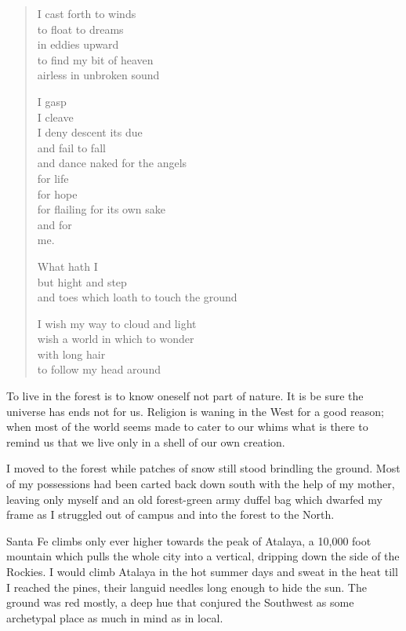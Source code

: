 \documentclass[ebook, 10pt, openright, onecolumn]{memoir}
\newenvironment{poetry}
{
  \begin{quote}
    \begin{itshape}
      \small
    }
    {
    \end{itshape}
  \end{quote}
}
\begin{document}
\begin{poetry}
  I cast forth to winds\\
  to float to dreams\\
  in eddies upward\\
  to find my bit of heaven\\
  airless in unbroken sound

  I gasp\\
  I cleave\\
  I deny descent its due\\
  and fail to fall\\
  and dance naked for the angels\\
  for life\\
  for hope\\
  for flailing for its own sake\\
  and for\\
  me.
  
  What hath I\\
  but hight and step\\
  and toes which loath to touch the ground

  I wish my way to cloud and light\\
  wish a world in which to wonder\\
  with long hair\\
  to follow my head around\\
\end{poetry}

To live in the forest is to know oneself not part of nature.  It is be sure the
universe has ends not for us.  Religion is waning in the West for a good
reason; when most of the world seems made to cater to our whims what is there to
remind us that we live only in a shell of our own creation.

I moved to the forest while patches of snow still stood brindling the
ground. Most of my possessions had been carted back down south with the help of
my mother, leaving only myself and an old forest-green army duffel bag which
dwarfed my frame as I struggled out of campus and into the forest to the North.

Santa Fe climbs only ever higher towards the peak of Atalaya, a 10,000 foot
mountain which pulls the whole city into a vertical, dripping down the side of
the Rockies. I would climb Atalaya in the hot summer days and sweat in the heat
till I reached the pines, their languid needles long enough to hide the sun.
The ground was red mostly, a deep hue that conjured the Southwest as some
archetypal place as much in mind as in local.
\end{document}
